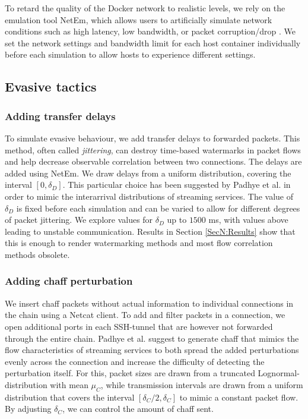 To retard the quality of the Docker network to realistic levels, we rely on the emulation tool NetEm, which allows users to artificially simulate network conditions such as high latency, low bandwidth, or packet corruption/drop \cite{hemminger2005network}.
We set the network settings and bandwidth limit for each host container individually before each simulation to allow hosts to experience different settings.

\subsection{Evasive tactics}

\subsubsection{Adding transfer delays}\label{SecN:delays_desc}

To simulate evasive behaviour, we add transfer delays to forwarded packets. This method, often called \textit{jittering}, can destroy time-based watermarks in packet flows and help decrease observable correlation between two connections. The delays are added using NetEm. We draw delays from a uniform distribution, covering the interval $[0,\delta_D]$. This particular choice has been suggested by Padhye et al. \cite{padhye2010evading} in order to mimic the interarrival distributions of streaming services. The value of $\delta_D$ is fixed before each simulation and can be varied to allow for different degrees of packet jittering. We explore values for $\delta_D$ up to $1500$ ms, with values above leading to unstable communication. Results in Section \ref{SecN:Results} show that this is enough to render watermarking methods and most flow correlation methods obsolete.


\vspace{-0.6cm}
\subsubsection{Adding chaff perturbation}\label{SecN:chaff_desc}

We insert chaff packets without actual information to individual connections in the chain using a Netcat client. %
To add and filter packets in a connection, we open additional ports in each SSH-tunnel that are however not forwarded through the entire chain. 
Padhye et al. \cite{padhye2010evading} suggest to generate chaff that mimics the flow characteristics of streaming services to both spread the added perturbations evenly across the connection and increase the difficulty of detecting the perturbation itself.
For this, packet sizes are drawn from a truncated Lognormal-distribution with mean $\mu_C$, while transmission intervals are drawn from a uniform distribution that covers the interval $[\delta_C/2,\delta_C]$ to mimic a constant packet flow. By adjusting $\delta_C$, we can control the amount of chaff sent.

